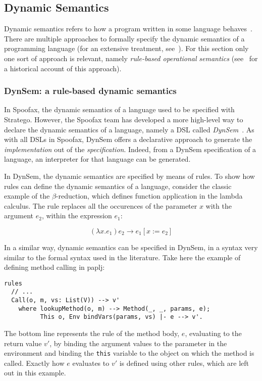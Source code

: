 \subsection{Dynamic Semantics}
\label{sec-dynamic-semantics}
Dynamic semantics refers to how a program written in some language
behaves~\cite{Winskel93}. There are multiple approaches to
formally specify the dynamic semantics of a programming language (for
an extensive treatment, see~\cite{Winskel93}). For this section
only one sort of approach is relevant, namely \emph{rule-based operational}
\emph{semantics} (see~\cite{Plotkin04} for a historical account of this
approach).

\subsubsection{DynSem: a rule-based dynamic semantics}
\label{ssec-dynsem}
In Spoofax, the dynamic semantics of a language used to be specified
with Stratego. However, the Spoofax team has developed a more
high-level way to declare the dynamic semantics of a language, namely
a DSL called \emph{DynSem}~\cite{VerguNV15}. As with all DSLs in
Spoofax, DynSem offers a declarative approach to generate the
\emph{implementation} out of the \emph{specification}. Indeed, from a DynSem
specification of a language, an interpreter for that language can be
generated.

In DynSem, the dynamic semantics are specified by means of rules. To
show how rules can define the dynamic semantics of a language,
consider the classic example of the \(\beta\)-reduction, which defines
function application in the lambda calculus. The rule replaces all the
occurences of the parameter \(x\) with the argument \(e_2\), within the
expression \(e_1\):

\begin{equation}
(\lambda x.e_1) e_2 \rightarrow e_1[x := e_2]
\end{equation}

In a similar way, dynamic semantics can be specified in DynSem, in a
syntax very similar to the formal syntax used in the literature. Take
here the example of defining method calling in paplj:

\begin{verbatim}
rules
  // ...
  Call(o, m, vs: List(V)) --> v'
    where lookupMethod(o, m) --> Method(_, _, params, e);
          This o, Env bindVars(params, vs) |- e --> v'.
\end{verbatim}

The bottom line represents the rule of the method body, \(e\),
evaluating to the return value \(v'\), by binding the argument values to
the parameter in the environment and binding the \texttt{this} variable to
the object on which the method is called. Exactly how \(e\) evaluates to
\(v'\) is defined using other rules, which are left out in this example.
